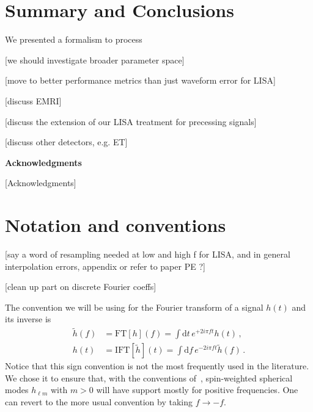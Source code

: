 \documentclass[aps,showpacs,twocolumn,
prd,superscriptaddress,nofootinbib]{revtex4-1}
\newcommand\ud{{\mathrm{d}}}
\newcommand{\SM}[1]{{\color{Red} #1}}
\begin{document}

\section{Summary and Conclusions}
\label{sec:discussion}

We presented a formalism to process 

\SM{[we should investigate broader parameter space]}

\SM{[move to better performance metrics than just waveform error for LISA]}

\SM{[discuss EMRI]}

\SM{[discuss the extension of our LISA treatment for precessing signals]}

\SM{[discuss other detectors, e.g. ET]}


\vspace{4.5mm}

\hspace{0.85in}
{\bf Acknowledgments}

\vspace{3.5mm}

[Acknowledgments]


\appendix

\section{Notation and conventions}
\label{app:notation}

\SM{[say a word of resampling needed at low and high f for LISA, and in general interpolation errors, appendix or refer to paper PE ?]}

\SM{[clean up part on discrete Fourier coeffs]}

The convention we will be using for the Fourier transform of a signal $h(t)$ and its inverse is
\begin{subequations}
\label{eq:defFT}
\begin{align}
	\tilde{h}(f) &= \mathrm{FT}[h](f) =  \int \ud t \, e^{+2i\pi f t} h(t) \,, \\
	h(t) &= \mathrm{IFT}[\tilde{h}](t) =  \int \ud f \, e^{-2i\pi f t} \tilde{h}(f) \,.
\end{align}
\end{subequations}
Notice that this sign convention is not the most frequently used in the literature. We chose it to ensure that, with the conventions of~\cite{BlanchetLiving}, spin-weighted spherical modes $h_{\ell m}$ with $m>0$ will have support mostly for positive frequencies. One can revert to the more usual convention by taking $f\rightarrow -f$.
\end{document}
